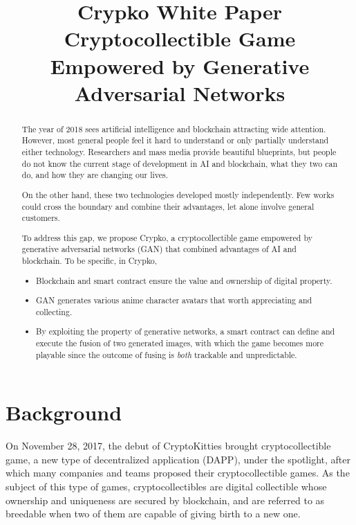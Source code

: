 \documentclass[a4paper]{article}
\title{Crypko White Paper \\
  \large Cryptocollectible Game Empowered by Generative Adversarial Networks\\
  \rightline{\small ver 0.8.1}
}
\author{}
\date{}
\begin{document}
\maketitle

\begin{abstract}

The year of 2018 sees artificial intelligence and blockchain attracting wide attention.
However, most general people feel it hard to understand or only partially understand either technology. Researchers and mass media provide beautiful blueprints, but people do not know the current stage of development in AI and blockchain, what they two can do, and how they are changing our lives. 

On the other hand, these two technologies developed mostly independently. Few works could cross the boundary and combine their advantages, let alone involve general customers. 

To address this gap, we propose Crypko, a cryptocollectible game empowered by generative adversarial networks (GAN) that combined advantages of AI and blockchain. To be specific, in Crypko,

\begin{itemize}
\item Blockchain and smart contract ensure the value and ownership of digital property.
\item GAN generates various anime character avatars that worth appreciating and collecting.
\item By exploiting the property of generative networks, a smart contract can define and execute the fusion of two generated images, with which the game becomes more playable since the outcome of fusing is \emph{both} trackable and unpredictable. 
\end{itemize}

\end{abstract}

\thispagestyle{empty}

\newpage

\section{Background}

On November 28, 2017, the debut of CryptoKitties\cite{cryptokitties} brought cryptocollectible game, a new type of decentralized application (DAPP), under the spotlight, after which many companies and teams proposed their cryptocollectible games\cite{cryptomons,cryptocountries,cryptopets,cryptoarts,cryptolandmarks,cryptofighters,etheremon,etherwaifu}. As the subject of this type of games, cryptocollectibles are digital collectible whose ownership and uniqueness are secured by blockchain, and are referred to as breedable when two of them are capable of giving birth to a new one.
\end{document}
